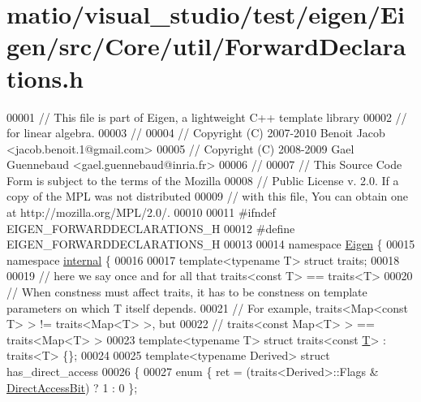 \hypertarget{matio_2visual__studio_2test_2eigen_2_eigen_2src_2_core_2util_2_forward_declarations_8h_source}{}\section{matio/visual\+\_\+studio/test/eigen/\+Eigen/src/\+Core/util/\+Forward\+Declarations.h}
\label{matio_2visual__studio_2test_2eigen_2_eigen_2src_2_core_2util_2_forward_declarations_8h_source}

\begin{DoxyCode}
00001 \textcolor{comment}{// This file is part of Eigen, a lightweight C++ template library}
00002 \textcolor{comment}{// for linear algebra.}
00003 \textcolor{comment}{//}
00004 \textcolor{comment}{// Copyright (C) 2007-2010 Benoit Jacob <jacob.benoit.1@gmail.com>}
00005 \textcolor{comment}{// Copyright (C) 2008-2009 Gael Guennebaud <gael.guennebaud@inria.fr>}
00006 \textcolor{comment}{//}
00007 \textcolor{comment}{// This Source Code Form is subject to the terms of the Mozilla}
00008 \textcolor{comment}{// Public License v. 2.0. If a copy of the MPL was not distributed}
00009 \textcolor{comment}{// with this file, You can obtain one at http://mozilla.org/MPL/2.0/.}
00010 
00011 \textcolor{preprocessor}{#ifndef EIGEN\_FORWARDDECLARATIONS\_H}
00012 \textcolor{preprocessor}{#define EIGEN\_FORWARDDECLARATIONS\_H}
00013 
00014 \textcolor{keyword}{namespace }\hyperlink{namespace_eigen}{Eigen} \{
00015 \textcolor{keyword}{namespace }\hyperlink{namespaceinternal}{internal} \{
00016 
00017 \textcolor{keyword}{template}<\textcolor{keyword}{typename} T> \textcolor{keyword}{struct }traits;
00018 
00019 \textcolor{comment}{// here we say once and for all that traits<const T> == traits<T>}
00020 \textcolor{comment}{// When constness must affect traits, it has to be constness on template parameters on which T itself
       depends.}
00021 \textcolor{comment}{// For example, traits<Map<const T> > != traits<Map<T> >, but}
00022 \textcolor{comment}{//              traits<const Map<T> > == traits<Map<T> >}
00023 \textcolor{keyword}{template}<\textcolor{keyword}{typename} T> \textcolor{keyword}{struct }traits<const \hyperlink{group___sparse_core___module_class_eigen_1_1_triplet}{T}> : traits<T> \{\};
00024 
00025 \textcolor{keyword}{template}<\textcolor{keyword}{typename} Derived> \textcolor{keyword}{struct }has\_direct\_access
00026 \{
00027   \textcolor{keyword}{enum} \{ ret = (traits<Derived>::Flags & \hyperlink{group__flags_gabf1e9d0516a933445a4c307ad8f14915}{DirectAccessBit}) ? 1 : 0 \};

\end{DoxyCode}
